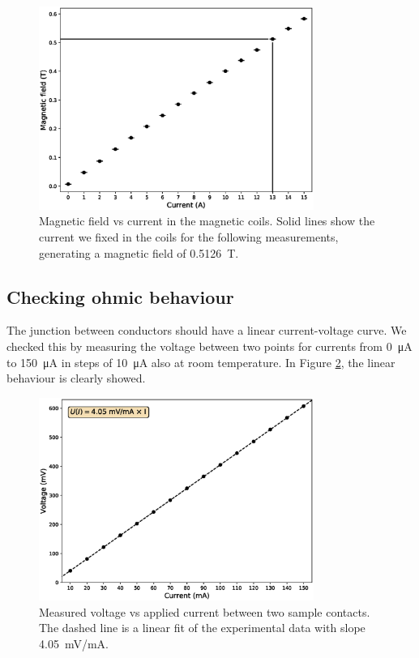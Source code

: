 \documentclass[11pt,a4paper]{article}
\begin{document}
\begin{figure}[ht]
\centering
\includegraphics[width=0.8\textwidth]{Magnetic_field_vs_current.eps}
\caption{Magnetic field vs current in the magnetic coils. Solid lines show the current we fixed in the coils for the following measurements, generating a magnetic field of \SI{0.5126}{\tesla}.}
\label{fig:magnetic_field}
\end{figure}

\subsection{Checking ohmic behaviour}

The junction between conductors should have a linear current-voltage curve. We checked this by measuring the voltage between two points for currents from \SI{0}{\micro\ampere} to \SI{150}{\micro\ampere} in steps of \SI{10}{\micro\ampere} also at room temperature. In Figure \ref{fig:ohmic_check}, the linear behaviour is clearly showed.

\begin{figure}[ht]
\centering
\includegraphics[width=0.8\textwidth]{Voltage_vs_current_ohmic_test.eps}
\caption{Measured voltage vs applied current between two sample contacts. The dashed line is a linear fit of the experimental data with slope \SI{4.05}{\milli\volt/\milli\ampere}.}
\label{fig:ohmic_check}
\end{figure}
\end{document}
